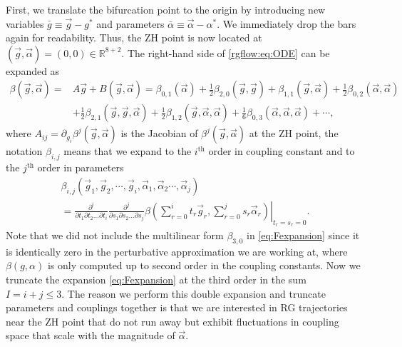 \begin{subappendices}
First, we translate the bifurcation point to the origin by introducing
new variables $\bar g \equiv \vec g - g^\ast$ and parameters $\bar \alpha \equiv \vec \alpha -
\alpha^\ast$. We immediately drop the bars again for readability. Thus, the
ZH point is now located at $(\vec{g}, \vec{\alpha}) = (0,0) \in \mathbb
R^{8 + 2}$. The right-hand side of \cref{rgflow:eq:ODE} can be expanded as
\begin{equation}
\label{eq:Fexpansion}
\begin{aligned}
    \beta(\vec{g}, \vec{\alpha}) =& 
    A\vec g + B(\vec{g},\vec{\alpha}) = \mathcal \beta_{0,1} (\vec{\alpha}) 
    + \frac12 \mathcal \beta_{2,0}(\vec g,\vec g) + \mathcal \beta_{1,1}(\vec g,\vec \alpha) 
    + \frac12 \mathcal \beta_{0,2}(\vec \alpha,\vec \alpha)  \\
    &  + \frac12 \mathcal \beta_{2,1}(\vec g,\vec g,\vec \alpha)
       + \frac12 \mathcal \beta_{1,2}(\vec g, \vec \alpha, \vec \alpha) 
       + \frac16 \mathcal \beta_{0,3}(\vec \alpha,\vec \alpha,\vec \alpha) + \cdots,
\end{aligned}
\end{equation}
where $A_{ij} =\partial_{g_i} \beta^j(\vec g,\vec \alpha)$ is the Jacobian of $\beta^j(\vec g,\vec \alpha)$ at the ZH point, 
the notation $\beta_{i,j}$ means that we expand to the $i^{\text{th}}$ order in coupling constant and to the $j^{\text{th}}$ order in parameters
\begin{multline}
   \mathcal \beta_{i,j}(\vec{g}_1, \vec{g}_2, \cdots, \vec{g}_i, \vec{\alpha}_1, \vec{\alpha}_2 \cdots, \vec{\alpha}_j)  \\
    = \frac{\partial^i}{\partial t_1 \partial t_2 \dots \partial t_i}
      \frac{\partial^j}{\partial s_1 \partial s_2 \dots \partial s_j}
        \left. \beta\left(\sum_{r=0}^i t_r \vec{g}_r,  \sum_{r=0}^j s_r \vec{\alpha}_r\right) 
            \right\vert_{t_r=s_r=0}.
\end{multline}
Note that we did not include the multilinear form $\mathcal \beta_{3,0}$ in
\cref{eq:Fexpansion} since it is identically zero in the perturbative approximation we are working at, where $\beta(g,\alpha)$ is only computed up to second order in the coupling constants. Now we truncate the expansion \cref{eq:Fexpansion} at the third order in the sum $I=i+j\leq 3$. The reason we perform this double expansion and truncate parameters and couplings together is that we are interested in RG trajectories near the ZH point that do not run away but exhibit fluctuations in coupling space that scale with the magnitude of $\vec{\alpha}$.


\end{subappendices}
